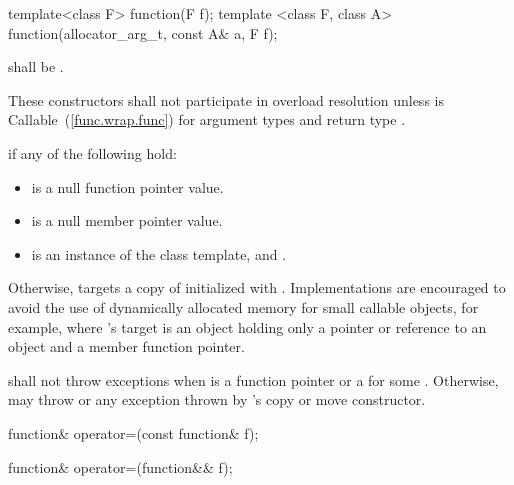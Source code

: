 \begin{itemdecl}
template<class F> function(F f);
template <class F, class A> function(allocator_arg_t, const A& a, F f);
\end{itemdecl}

\begin{itemdescr}
\pnum
\requires {} shall be .

\pnum
\remarks These constructors shall not participate in overload resolution unless
 is Callable~(\ref{func.wrap.func}) for argument types
 and return type .

\pnum
\postconditions {} if any of the following hold:
\begin{itemize}
\item {} is a null function pointer value.
\item {} is a null member pointer value.
\item {} is an instance of the  class template, and
  .
\end{itemize}

\pnum
Otherwise,  targets a copy of 
initialized with .
\enternote Implementations are encouraged to avoid the use of
dynamically allocated memory for small callable objects, for example,
where 's target is an object holding only a pointer or
reference to an object and a member function pointer. \exitnote

\pnum
\throws shall not throw exceptions when  is a function pointer
or a  for some . Otherwise,
may throw  or any exception thrown by 's copy
or move constructor.
\end{itemdescr}

%
%
\begin{itemdecl}
function& operator=(const function& f);
\end{itemdecl}

\begin{itemdescr}
\pnum
\effects {}

\pnum
\returns {}
\end{itemdescr}

%
%
\begin{itemdecl}
function& operator=(function&& f);
\end{itemdecl}

